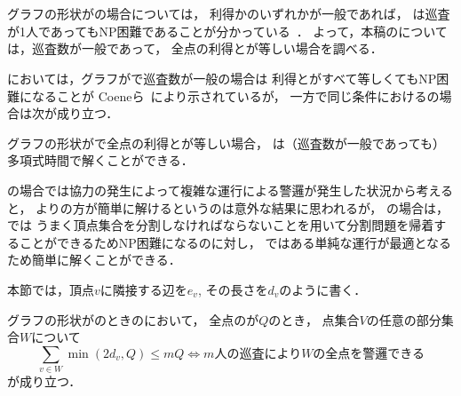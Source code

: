 \section{{\graphStar}}
\label{section: star}

グラフの形状が{\graphStar}の場合については，
利得か{\idletime}のいずれかが一般であれば，
{\patProb}は巡査が1人であってもNP困難であることが分かっている~\cite{coene2011charlemagne}．
よって，本稿の{\patProb}については，巡査数が一般であって，
全点の利得と{\idletime}が等しい場合を調べる．

{\independentPatProb}においては，グラフが{\graphStar}で巡査数が一般の場合は
利得と{\idletime}がすべて等しくてもNP困難になることが
Coeneら~\cite{coene2011charlemagne}により示されているが，
一方で同じ条件における{\patProb}の場合は次が成り立つ．

\begin{theo}
  \label{theo:StarEqualProfitTimelimit}
  グラフの形状が{\graphStar}で全点の利得と{\idletime}が等しい場合，
  {\patProb}は（巡査数が一般であっても）多項式時間で解くことができる．
\end{theo}


{\graphLine}の場合では協力の発生によって複雑な運行による警邏が発生した状況から考えると，
{\independentPatProb}より{\patProb}の方が簡単に解けるというのは意外な結果に思われるが，
{\graphStar}の場合は，{\independentPatProb}では
うまく頂点集合を分割しなければならないことを用いて分割問題を帰着することができるためNP困難になるのに対し，
{\patProb}ではある単純な運行が最適となるため簡単に解くことができる．


本節では，頂点$v$に隣接する辺を$e_v$, その長さを$d_v$のように書く．

\begin{lemm}
  \label{lemm:condition_of_guarding_star}
  グラフの形状が{\graphStar}のときの{\patProb}において，
  全点の{\idletime}が$Q$のとき，
  点集合$V$の任意の部分集合$W$について
  $$
    \sum_{v \in W} \min(2d_v, Q) \leq mQ
    \iff \textrm{$m$人の巡査により$W$の全点を警邏できる}
  $$
  が成り立つ．
\end{lemm}





